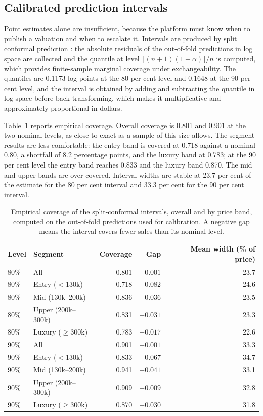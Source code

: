 \subsection{Calibrated prediction intervals}

Point estimates alone are insufficient, because the platform must know when to
publish a valuation and when to escalate it. Intervals are produced by split
conformal prediction \citep{angelopoulos2023conformal}: the absolute residuals of the
out-of-fold predictions in log space are collected and the quantile at level
$\lceil (n+1)(1-\alpha)\rceil/n$ is computed, which provides finite-sample marginal
coverage under exchangeability. The quantiles are 0.1173 log points at the 80 per
cent level and 0.1648 at the 90 per cent level, and the interval is obtained by
adding and subtracting the quantile in log space before back-transforming, which
makes it multiplicative and approximately proportional in dollars.

Table~\ref{tab:coverage} reports empirical coverage. Overall coverage is 0.801 and
0.901 at the two nominal levels, as close to exact as a sample of this size allows.
The segment results are less comfortable: the entry band is covered at 0.718 against
a nominal 0.80, a shortfall of 8.2 percentage points, and the luxury band at 0.783;
at the 90 per cent level the entry band reaches 0.833 and the luxury band 0.870. The
mid and upper bands are over-covered. Interval widths are stable at 23.7 per cent of
the estimate for the 80 per cent interval and 33.3 per cent for the 90 per cent
interval.

\begin{table}[htbp]
\centering
\caption{Empirical coverage of the split-conformal intervals, overall and by price
band, computed on the out-of-fold predictions used for calibration. A negative gap
means the interval covers fewer sales than its nominal level.}
\label{tab:coverage}
\small
\begin{tabular}{@{}llrrr@{}}
\toprule
\textbf{Level} & \textbf{Segment} & \textbf{Coverage} & \textbf{Gap} & \textbf{Mean width (\% of price)} \\
\midrule
80\% & All & 0.801 & $+0.001$ & 23.7 \\
80\% & Entry ($<$130k) & 0.718 & $-0.082$ & 24.6 \\
80\% & Mid (130k--200k) & 0.836 & $+0.036$ & 23.5 \\
80\% & Upper (200k--300k) & 0.831 & $+0.031$ & 23.3 \\
80\% & Luxury ($\geq$300k) & 0.783 & $-0.017$ & 22.6 \\
90\% & All & 0.901 & $+0.001$ & 33.3 \\
90\% & Entry ($<$130k) & 0.833 & $-0.067$ & 34.7 \\
90\% & Mid (130k--200k) & 0.941 & $+0.041$ & 33.1 \\
90\% & Upper (200k--300k) & 0.909 & $+0.009$ & 32.8 \\
90\% & Luxury ($\geq$300k) & 0.870 & $-0.030$ & 31.8 \\
\bottomrule
\end{tabular}
\end{table}

